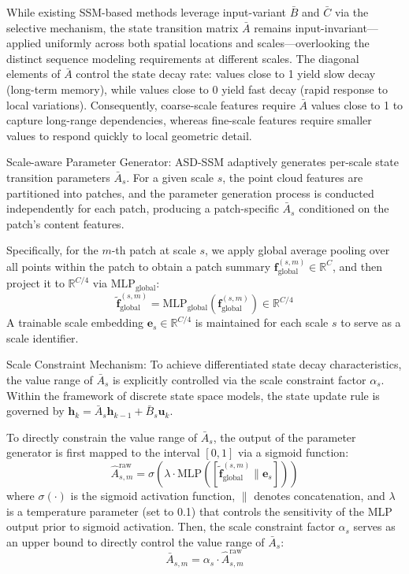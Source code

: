 \documentclass[a4paper,fleqn]{cas-sc}
\begin{document}
While existing SSM-based methods leverage input-variant $\bar{B}$ and $\bar{C}$ via the selective mechanism, the state transition matrix $\bar{A}$ remains input-invariant—applied uniformly across both spatial locations and scales—overlooking the distinct sequence modeling requirements at different scales. The diagonal elements of $\bar{A}$ control the state decay rate: values close to 1 yield slow decay (long-term memory), while values close to 0 yield fast decay (rapid response to local variations). Consequently, coarse-scale features require $\bar{A}$ values close to 1 to capture long-range dependencies, whereas fine-scale features require smaller values to respond quickly to local geometric detail.

Scale-aware Parameter Generator: ASD-SSM adaptively generates per-scale state transition parameters $\bar{A}_s$. For a given scale $s$, the point cloud features are partitioned into patches, and the parameter generation process is conducted independently for each patch, producing a patch-specific $\bar{A}_s$ conditioned on the patch's content features.

Specifically, for the $m$-th patch at scale $s$, we apply global average pooling over all points within the patch to obtain a patch summary $\mathbf{f}_{\text{global}}^{(s,m)} \in \mathbb{R}^{C}$, and then project it to $\mathbb{R}^{C/4}$ via $\text{MLP}_{\text{global}}$:
\begin{equation}
	\tilde{\mathbf{f}}_{\text{global}}^{(s,m)} = \text{MLP}_{\text{global}}(\mathbf{f}_{\text{global}}^{(s,m)}) \in \mathbb{R}^{C/4}
\end{equation}
A trainable scale embedding $\mathbf{e}_s \in \mathbb{R}^{C/4}$ is maintained for each scale $s$ to serve as a scale identifier.

Scale Constraint Mechanism: To achieve differentiated state decay characteristics, the value range of $\bar{A}_s$ is explicitly controlled via the scale constraint factor $\alpha_s$. Within the framework of discrete state space models, the state update rule is governed by $\mathbf{h}_k = \bar{A}_s\mathbf{h}_{k-1} + \bar{B}_s\mathbf{u}_k$.

To directly constrain the value range of $\bar{A}_s$, the output of the parameter generator is first mapped to the interval $[0,1]$ via a sigmoid function:
\begin{equation}
	\hat{A}_{s,m}^{\text{raw}} = \sigma(\lambda \cdot \text{MLP}([\tilde{\mathbf{f}}_{\text{global}}^{(s,m)} \| \mathbf{e}_s]))
\end{equation}
where $\sigma(\cdot)$ is the sigmoid activation function, $\|$ denotes concatenation, and $\lambda$ is a temperature parameter (set to 0.1) that controls the sensitivity of the MLP output prior to sigmoid activation. Then, the scale constraint factor $\alpha_s$ serves as an upper bound to directly control the value range of $\bar{A}_s$:
\begin{equation}
	\bar{A}_{s,m} = \alpha_s \cdot \hat{A}_{s,m}^{\text{raw}}
\end{equation}
\end{document}
